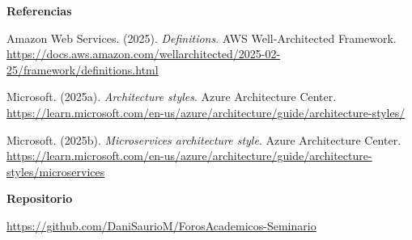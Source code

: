 \documentclass[12pt,letterpaper]{article}
\begin{document}
\textbf{Referencias}

Amazon Web Services. (2025). \textit{Definitions}. AWS Well-Architected Framework. \url{https://docs.aws.amazon.com/wellarchitected/2025-02-25/framework/definitions.html}


Microsoft. (2025a). \textit{Architecture styles}. Azure Architecture Center. \url{https://learn.microsoft.com/en-us/azure/architecture/guide/architecture-styles/}

Microsoft. (2025b). \textit{Microservices architecture style}. Azure Architecture Center. \url{https://learn.microsoft.com/en-us/azure/architecture/guide/architecture-styles/microservices}

\textbf{Repositorio}

\noindent\url{https://github.com/DaniSaurioM/ForosAcademicos-Seminario}
\end{document}
